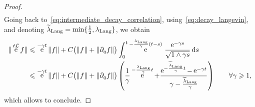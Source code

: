 \documentclass[11pt,a4paper]{article}
\DeclareMathOperator{\e}{e}
\renewcommand{\d}{\mathrm d}
\theoremstyle{plain}
\numberwithin{equation}{section}
\renewcommand{\leq}{\leqslant}
\renewcommand{\geq}{\geqslant}
\begin{document}
\begin{proof}
\begin{align*}
    \end{align*}
    Going back to~\eqref{eq:intermediate_decay_correlation}, using~\eqref{eq:decay_langevin},
    and denoting $\widetilde \lambda_{\rm Lang} = \min \{\frac{1}{2}, \lambda_{\rm Lang} \}$,
    we obtain
    \begin{align*}
        \norm*{ \e^{t \mathcal L} f}
        &\leq  \e^{-\gamma t} \norm{f}
        + C  \bigl( \norm{f} + \norm{\partial_q f}\bigr) \int_{0}^{t} \e^{-\frac{\lambda_{\rm Lang}}{\gamma}(t-s)}  \, \frac{\e^{-\gamma s}}{\sqrt{1 \wedge \gamma s}} \, \d s \\
        &\leq  \e^{-\gamma t} \norm{f}
        + C \bigl( \norm{f} + \norm{\partial_q f} \bigr)
        \left( \frac{1}{\gamma} \e^{-\frac{\lambda_{\rm Lang}}{\gamma} t} + \frac{\e^{- \frac{\widetilde \lambda_{\rm Lang}}{\gamma}t} - \e^{- \gamma t}}{\gamma - \frac{\widetilde \lambda_{\rm Lang}}{\gamma}} \right) \qquad \forall \gamma \geq 1,
    \end{align*}
    which allows to conclude.
\end{proof}
\end{document}
